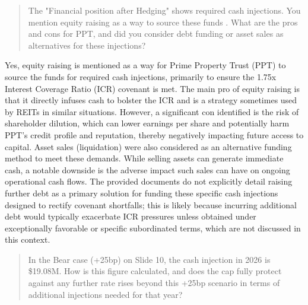 \documentclass[11pt, a4paper, british]{article}
\begin{document}
\newpage

\begin{quote}
    The "Financial position after Hedging" shows required cash injections. You mention equity raising as a way to source these funds . What are the pros and cons for PPT, and did you consider debt funding or asset sales as alternatives for these injections?
\end{quote}

Yes, equity raising is mentioned as a way for Prime Property Trust (PPT) to source the funds for required cash injections, primarily to ensure the 1.75x Interest Coverage Ratio (ICR) covenant is met. The main pro of equity raising is that it directly infuses cash to bolster the ICR and is a strategy sometimes used by REITs in similar situations. However, a significant con identified is the risk of shareholder dilution, which can lower earnings per share and potentially harm PPT's credit profile and reputation, thereby negatively impacting future access to capital. Asset sales (liquidation) were also considered as an alternative funding method to meet these demands. While selling assets can generate immediate cash, a notable downside is the adverse impact such sales can have on ongoing operational cash flows. The provided documents do not explicitly detail raising further debt as a primary solution for funding these specific cash injections designed to rectify covenant shortfalls; this is likely because incurring additional debt would typically exacerbate ICR pressures unless obtained under exceptionally favorable or specific subordinated terms, which are not discussed in this context.

\newpage

\begin{quote}
    In the Bear case (+25bp) on Slide 10, the cash injection in 2026 is \$19.08M. How is this figure calculated, and does the cap fully protect against any further rate rises beyond this +25bp scenario in terms of additional injections needed for that year?
\end{quote}
\end{document}
